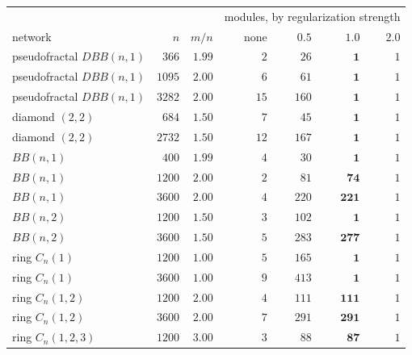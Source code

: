 \begin{center}
\footnotesize\setlength{\tabcolsep}{4pt}
\begin{tabular}{lrrrrrr}
\hline
 & & & \multicolumn{4}{c}{modules, by regularization strength}\\
network & $n$ & $m/n$ & none & $0.5$ & $1.0$ & $2.0$\\
\hline
pseudofractal $DBB(n,1)$ & $366$ & $1.99$ & $2$ & $26$ & $\mathbf{1}$ & $1$\\
pseudofractal $DBB(n,1)$ & $1095$ & $2.00$ & $6$ & $61$ & $\mathbf{1}$ & $1$\\
pseudofractal $DBB(n,1)$ & $3282$ & $2.00$ & $15$ & $160$ & $\mathbf{1}$ & $1$\\
diamond $(2,2)$ & $684$ & $1.50$ & $7$ & $45$ & $\mathbf{1}$ & $1$\\
diamond $(2,2)$ & $2732$ & $1.50$ & $12$ & $167$ & $\mathbf{1}$ & $1$\\
$BB(n,1)$ & $400$ & $1.99$ & $4$ & $30$ & $\mathbf{1}$ & $1$\\
$BB(n,1)$ & $1200$ & $2.00$ & $2$ & $81$ & $\mathbf{74}$ & $1$\\
$BB(n,1)$ & $3600$ & $2.00$ & $4$ & $220$ & $\mathbf{221}$ & $1$\\
$BB(n,2)$ & $1200$ & $1.50$ & $3$ & $102$ & $\mathbf{1}$ & $1$\\
$BB(n,2)$ & $3600$ & $1.50$ & $5$ & $283$ & $\mathbf{277}$ & $1$\\
ring $C_n(1)$ & $1200$ & $1.00$ & $5$ & $165$ & $\mathbf{1}$ & $1$\\
ring $C_n(1)$ & $3600$ & $1.00$ & $9$ & $413$ & $\mathbf{1}$ & $1$\\
ring $C_n(1,2)$ & $1200$ & $2.00$ & $4$ & $111$ & $\mathbf{111}$ & $1$\\
ring $C_n(1,2)$ & $3600$ & $2.00$ & $7$ & $291$ & $\mathbf{291}$ & $1$\\
ring $C_n(1,2,3)$ & $1200$ & $3.00$ & $3$ & $88$ & $\mathbf{87}$ & $1$\\
\hline
\end{tabular}
\end{center}
